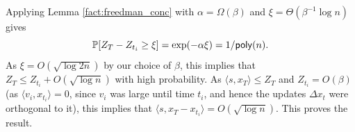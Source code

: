 \medskip
{}
Applying Lemma \ref{fact:freedman_conc} with $\alpha = \Omega(\beta)$ and $\xi = \Theta(\beta^{-1} \log n) $ gives 
\[
\mathbb{P}[Z_T - Z_{t_i} \geq \xi] = \exp(-\alpha \xi ) = 1/\mathsf{poly}(n). 
\]
As $\xi = O(\sqrt{\log2n})$ by our choice of $\beta$, this implies that $Z_T \leq Z_{t_i} + O(\sqrt{\log n})$  with high probability.
As
$\langle s, x_T \rangle \leq Z_T$ 
and $Z_{t_i} = O(\beta)$ (as $\langle v_i,x_{t_i}\rangle=0$, since $v_i$ was large until time $t_i$, and hence the updates $\Delta x_t$ were orthogonal to it), this implies that
$
\langle s, x_T - x_{t_i} \rangle = O(\sqrt{\log n})$. This proves the result. \qedhere








